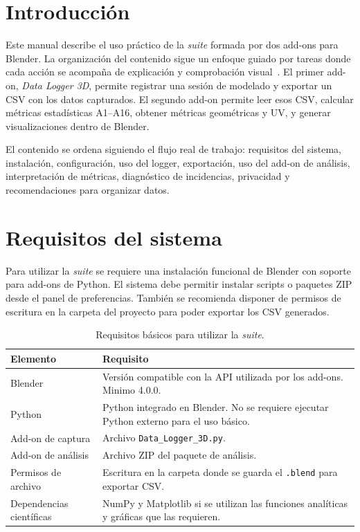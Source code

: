 \label{apendice:manual_usuario}

\section{Introducción}
\label{sec:e-introduccion}

Este manual describe el uso práctico de la \textit{suite} formada por dos add-ons para Blender. La organización del contenido sigue un enfoque guiado por tareas donde cada acción se acompaña de explicación y comprobación visual~\cite{nielsen1994usability}. El primer add-on, \textit{Data Logger 3D}, permite registrar una sesión de modelado y exportar un CSV con los datos capturados. El segundo add-on permite leer esos CSV, calcular métricas estadísticas A1--A16, obtener métricas geométricas y UV, y generar visualizaciones dentro de Blender.

El contenido se ordena siguiendo el flujo real de trabajo: requisitos del sistema, instalación, configuración, uso del logger, exportación, uso del add-on de análisis, interpretación de métricas, diagnóstico de incidencias, privacidad y recomendaciones para organizar datos.

\section{Requisitos del sistema}
\label{sec:e-requisitos-sistema}

Para utilizar la \textit{suite} se requiere una instalación funcional de Blender con soporte para add-ons de Python. El sistema debe permitir instalar scripts o paquetes ZIP desde el panel de preferencias. También se recomienda disponer de permisos de escritura en la carpeta del proyecto para poder exportar los CSV generados.

\begin{table}[H]
\centering
\scriptsize
\renewcommand{\arraystretch}{1.15}
\begin{tabularx}{\textwidth}{p{3.5cm}X}
\toprule
\textbf{Elemento} & \textbf{Requisito} \\
\midrule
Blender & Versión compatible con la API utilizada por los add-ons. Minimo 4.0.0. \\
Python & Python integrado en Blender. No se requiere ejecutar Python externo para el uso básico. \\
Add-on de captura & Archivo \texttt{Data\_Logger\_3D.py}. \\
Add-on de análisis & Archivo ZIP del paquete de análisis. \\
Permisos de archivo & Escritura en la carpeta donde se guarda el \texttt{.blend} para exportar CSV. \\
Dependencias científicas & NumPy y Matplotlib si se utilizan las funciones analíticas y gráficas que las requieren. \\
\bottomrule
\end{tabularx}
\caption{Requisitos básicos para utilizar la \textit{suite}.}
\label{tab:e-requisitos}
\end{table}

